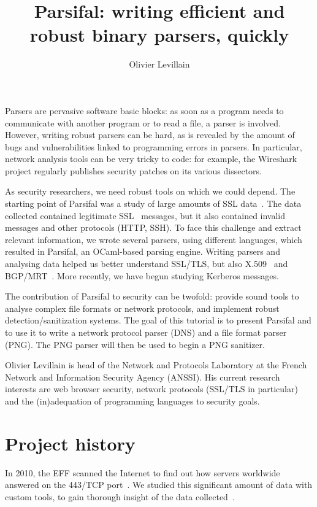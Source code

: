 \documentclass{article}
\title{Parsifal: writing efficient and robust binary parsers, quickly}
\author{Olivier Levillain}
\date{}
\begin{document}
\maketitle

Parsers are pervasive software basic blocks: as soon as a program
needs to communicate with another program or to read a file, a parser
is involved. However, writing robust parsers can be hard, as is
revealed by the amount of bugs and vulnerabilities linked to
programming errors in parsers.  In particular, network analysis tools
can be very tricky to code: for example, the Wireshark project
regularly publishes security patches on its various dissectors.

As security researchers, we need robust tools on which we could
depend. The starting point of Parsifal was a study of large amounts of
SSL data~\cite{acsac2012}. The data collected contained legitimate
SSL~\cite{rfc5246} messages, but it also contained invalid messages
and other protocols (HTTP, SSH). To face this challenge and extract
relevant information, we wrote several parsers, using different
languages, which resulted in Parsifal, an OCaml-based parsing
engine. Writing parsers and analysing data helped us better understand
SSL/TLS, but also X.509~\cite{rfc5280} and
BGP/MRT~\cite{rfc4271,rfc6396}. More recently, we have begun studying
Kerberos messages.

The contribution of Parsifal to security can be twofold: provide sound
tools to analyse complex file formats or network protocols, and
implement robust detection/sanitization systems.  The goal of this
tutorial is to present Parsifal and to use it to write a network
protocol parser (DNS) and a file format parser (PNG). The PNG parser
will then be used to begin a PNG sanitizer.

\medskip

Olivier Levillain is head of the Network and Protocols Laboratory at
the French Network and Information Security Agency (ANSSI). His
current research interests are web browser security, network protocols
(SSL/TLS in particular) and the (in)adequation of programming
languages to security goals.


\section{Project history}

In 2010, the EFF scanned the Internet to find out how servers
worldwide answered on the 443/TCP port~\cite{eff-observatory,
  eckersley-obs1, eckersley-obs2}. We studied this significant amount
of data with custom tools, to gain thorough insight of the data
collected~\cite{acsac2012}.
\end{document}
